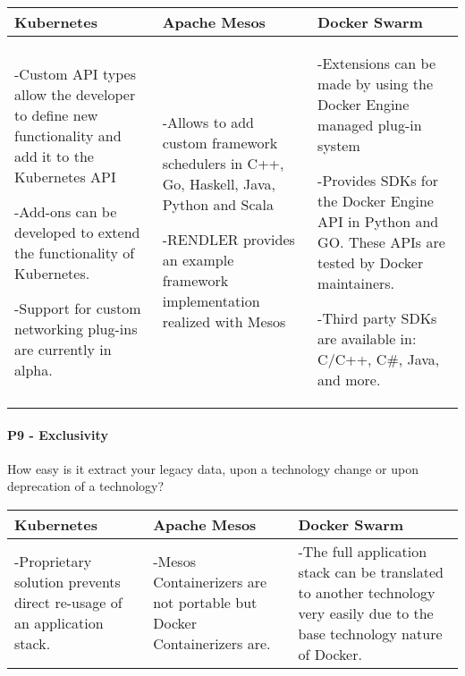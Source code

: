 \begin{center}
  \begin{tabular}{ | p{4.5cm} | p{4.5cm} | p{4.5cm} | }
    \hline
    \textbf{Kubernetes}&\textbf{Apache Mesos}&\textbf{Docker Swarm}\\\hline
    -Custom API types allow the developer to define new functionality and add it
    to the Kubernetes API
    
    -Add-ons can be developed to extend the functionality of Kubernetes.
    
    -Support for custom networking plug-ins are currently in alpha.& 
    
    -Allows to add custom framework schedulers in C++, Go, Haskell, Java, Python
    and Scala
    
    -RENDLER provides an example framework implementation realized with Mesos& 
    
    -Extensions can be made by using the Docker Engine managed plug-in system
    
    -Provides SDKs for the Docker Engine API in Python and GO. These APIs are
    tested by Docker maintainers.
    
    -Third party SDKs are available in: C/C++, C\#, Java, and more.\\
    \hline
  \end{tabular}
\end{center}

\paragraph{P9 - Exclusivity}

How easy is it extract your legacy data, upon a technology change or upon
deprecation of a technology?

\begin{center}
  \begin{tabular}{ | p{4.5cm} | p{4.5cm} | p{4.5cm} | }
    \hline
    \textbf{Kubernetes}&\textbf{Apache Mesos}&\textbf{Docker Swarm}\\\hline
    -Proprietary solution prevents direct re-usage of an application stack. & 
    
    -Mesos Containerizers are not portable but Docker Containerizers are. &
    
    -The full application stack can be translated to another technology very
    easily due to the base technology nature of Docker.\\
    \hline
  \end{tabular}
\end{center}

